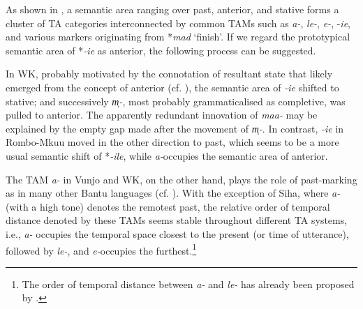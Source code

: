 \documentclass[output=paper]{langscibook}
\begin{document}
  As shown in , a semantic area ranging over past, anterior, and stative forms a cluster of TA categories interconnected by common TAMs such as \mbox{\textit{a-},} \textit{le-}, \textit{e-}, -\textit{ie}, and various markers originating from *\textit{mad} ‘finish’. If we regard the prototypical semantic area of *\textit{{}-ie} as anterior, the following process can be suggested.

  In WK, probably motivated by the connotation of resultant state that likely emerged from the concept of anterior (cf. \citealt[96]{Nurse2003b}), the semantic area of \textit{{}-ie} shifted to stative; and successively \textit{m̩-}, most probably grammaticalised as completive, was pulled to anterior. The apparently redundant innovation of \textit{maa-} may be explained by the empty gap made after the movement of \textit{m̩-}. In contrast, \textit{{}-ie} in Rombo-Mkuu moved in the other direction to past, which seems to be a more usual semantic shift of *\textit{{}-ile}, while \textit{a-}occupies the semantic area of anterior.

  The TAM \textit{a-} in Vunjo and WK, on the other hand, plays the role of past-marking as in many other Bantu languages (cf. \citealt[82]{Nurse2008}). With the exception of Siha, where \textit{a-} (with a high tone) denotes the remotest past, the relative order of temporal distance denoted by these TAMs seems stable throughout different TA systems, i.e., \textit{a-} occupies the temporal space closest to the present (or time of utterance), followed by \textit{le-}, and \textit{e-}occupies the furthest.\footnote{The order of temporal distance between \textit{a-} and \textit{le-} has already been proposed by \citet[74]{Nurse2003a}.}
\end{document}
